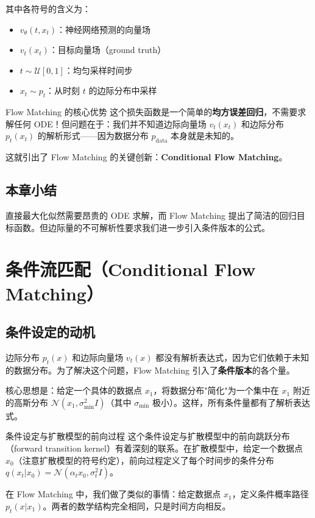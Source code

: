 \documentclass[a4paper]{article}
\begin{document}
其中各符号的含义为：
\begin{itemize}
    \item $v_\theta(t, x_t)$：神经网络预测的向量场
    \item $v_t(x_t)$：目标向量场（ground truth）
    \item $t \sim \mathcal{U}[0,1]$：均匀采样时间步
    \item $x_t \sim p_t$：从时刻 $t$ 的边际分布中采样
\end{itemize}

\begin{importantbox}{Flow Matching 的核心优势}
这个损失函数是一个简单的\textbf{均方误差回归}，不需要求解任何 ODE！但问题在于：我们并不知道边际向量场 $v_t(x_t)$ 和边际分布 $p_t(x_t)$ 的解析形式——因为数据分布 $p_{\text{data}}$ 本身就是未知的。

这就引出了 Flow Matching 的关键创新：\textbf{Conditional Flow Matching}。
\end{importantbox}

\subsection{本章小结}

直接最大化似然需要昂贵的 ODE 求解，而 Flow Matching 提出了简洁的回归目标函数。但边际量的不可解析性要求我们进一步引入条件版本的公式。


\section{条件流匹配（Conditional Flow Matching）}

\subsection{条件设定的动机}

边际分布 $p_t(x)$ 和边际向量场 $v_t(x)$ 都没有解析表达式，因为它们依赖于未知的数据分布。为了解决这个问题，Flow Matching 引入了\textbf{条件版本}的各个量。

核心思想是：给定一个具体的数据点 $x_1$，将数据分布"简化"为一个集中在 $x_1$ 附近的高斯分布 $\mathcal{N}(x_1, \sigma_{\min}^2 I)$（其中 $\sigma_{\min}$ 极小）。这样，所有条件量都有了解析表达式。

\begin{knowledgebox}{条件设定与扩散模型的前向过程}
这个条件设定与扩散模型中的前向跳跃分布（forward transition kernel）有着深刻的联系。在扩散模型中，给定一个数据点 $x_0$（注意扩散模型的符号约定），前向过程定义了每个时间步的条件分布 $q(x_t | x_0) = \mathcal{N}(\alpha_t x_0, \sigma_t^2 I)$。

在 Flow Matching 中，我们做了类似的事情：给定数据点 $x_1$，定义条件概率路径 $p_t(x | x_1)$。两者的数学结构完全相同，只是时间方向相反。
\end{knowledgebox}
\end{document}

